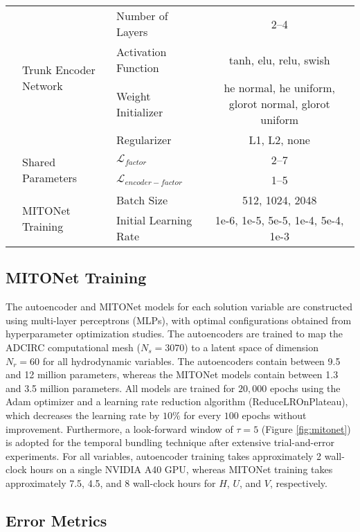 \documentclass[draft]{agujournal2019}
\begin{document}
\begin{table}[h]
{\begin{tabular}{p{.3cm} l l c}
 & \multirow{4}{*}{Trunk Encoder Network} 
 & Number of Layers & 2--4 \\
 && Activation Function & tanh, elu, relu, swish \\
 && Weight Initializer & he normal, he uniform, glorot normal, glorot uniform \\
 && Regularizer & L1, L2, none \\ \hhline{~---}

 & \multirow{2}{*}{Shared Parameters} 
 & $\mathcal{L}_{factor}$ & 2--7 \\
 && $\mathcal{L}_{encoder-factor}$ & 1--5 \\ \hhline{~---}

 & \multirow{2}{*}{MITONet Training} 
 & Batch Size & 512, 1024, 2048 \\
 && Initial Learning Rate & 1e-6, 1e-5, 5e-5, 1e-4, 5e-4, 1e-3 \\ \hline
\end{tabular}
}
\end{table}

\subsection{MITONet Training}

The autoencoder and MITONet models for each solution variable are constructed using multi-layer perceptrons (MLPs), with optimal configurations obtained from hyperparameter optimization studies. The autoencoders are trained to map the ADCIRC computational mesh ($N_s = 3070$) to a latent space of dimension $N_r = 60$ for all hydrodynamic variables. The autoencoders contain between 9.5 and 12 million parameters, whereas the MITONet models contain between 1.3 and 3.5 million parameters. All models are trained for $20,000$ epochs using the Adam optimizer \cite{kingma2015adam} and a learning rate reduction algorithm (ReduceLROnPlateau), which decreases the learning rate by $10\%$ for every $100$ epochs without improvement. Furthermore, a look-forward window of $\tau=5$ (Figure \ref{fig:mitonet}) is adopted for the temporal bundling technique after extensive trial-and-error experiments. For all variables, autoencoder training takes approximately 2 wall-clock hours on a single NVIDIA A40 GPU, whereas MITONet training takes approximately 7.5, 4.5, and 8 wall-clock hours for $H$, $U$, and $V$, respectively.

\subsection{Error Metrics}
\end{document}

